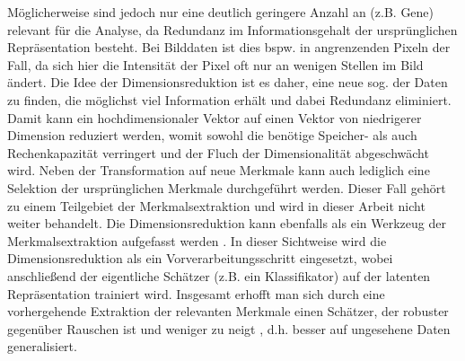 Möglicherweise sind jedoch nur eine deutlich geringere Anzahl an  (z.B. Gene)
relevant für die Analyse, da Redundanz im Informationsgehalt der ursprünglichen Repräsentation
besteht. Bei Bilddaten ist dies bspw. in angrenzenden Pixeln der Fall, da sich hier die Intensität
der Pixel oft nur an wenigen Stellen im Bild ändert. Die Idee der Dimensionsreduktion ist es daher,
eine neue sog.  der Daten zu finden, die möglichst viel Information
erhält und dabei Redundanz eliminiert. Damit kann ein hochdimensionaler Vektor auf einen Vektor von
niedrigerer Dimension reduziert werden, womit sowohl die benötige Speicher- als auch
Rechenkapazität verringert und der Fluch der Dimensionalität abgeschwächt wird. Neben der
Transformation auf neue Merkmale kann auch lediglich eine Selektion der ursprünglichen Merkmale
durchgeführt werden. Dieser Fall gehört zu einem Teilgebiet der Merkmalsextraktion \parencite{Guyon.2006} und wird in dieser Arbeit nicht weiter behandelt. Die Dimensionsreduktion kann
ebenfalls als ein Werkzeug der Merkmalsextraktion aufgefasst werden \parencite[3]{Guyon.2006b}. In dieser Sichtweise wird die Dimensionsreduktion als ein
Vorverarbeitungsschritt eingesetzt, wobei anschließend der eigentliche Schätzer (z.B. ein
Klassifikator) auf der latenten Repräsentation trainiert wird. Insgesamt erhofft man sich durch
eine vorhergehende Extraktion der relevanten Merkmale einen Schätzer, der robuster gegenüber
Rauschen ist und weniger zu  neigt \parencites[siehe][]{Plastria.2008}{MustafaAbdulSalam.2021}, d.h. besser auf ungesehene Daten
generalisiert.


